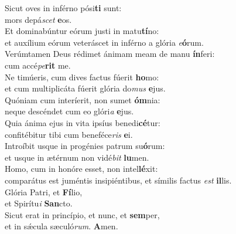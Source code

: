 \evenverse Sicut oves in inférno pósi\textbf{ti} sunt:~\*\\
\evenverse mors depá\textit{scet} \textbf{e}os.\\
\oddverse Et dominabúntur eórum justi in matu\textbf{tí}no:~\*\\
\oddverse et auxílium eórum veteráscet in inférno a glória \textit{e}\textbf{ó}rum.\\
\evenverse Verúmtamen Deus rédimet ánimam meam de manu \textbf{ín}feri:~\*\\
\evenverse cum accé\textit{pe}\textbf{rit} me.\\
\oddverse Ne timúeris, cum dives factus fúerit \textbf{ho}mo:~\*\\
\oddverse et cum multiplicáta fúerit glória do\textit{mus} \textbf{e}jus.\\
\evenverse Quóniam cum interíerit, non sumet \textbf{óm}nia:~\*\\
\evenverse neque descéndet cum eo glóri\textit{a} \textbf{e}jus.\\
\oddverse Quia ánima ejus in vita ipsíus benedi\textbf{cé}tur:~\*\\
\oddverse confitébitur tibi cum beneféce\textit{ris} \textbf{e}i.\\
\evenverse Introíbit usque in progénies patrum su\textbf{ó}rum:~\*\\
\evenverse et usque in ætérnum non vidé\textit{bit} \textbf{lu}men.\\
\oddverse Homo, cum in honóre esset, non intel\textbf{lé}xit:~\*\\
\oddverse comparátus est juméntis insipiéntibus, et símilis factus \textit{est} \textbf{il}lis.\\
\evenverse Glória Patri, et \textbf{Fí}lio,~\*\\
\evenverse et Spirítu\textit{i} \textbf{San}cto.\\
\oddverse Sicut erat in princípio, et nunc, et \textbf{sem}per,~\*\\
\oddverse et in sǽcula sæculó\textit{rum}. \textbf{A}men.\\

